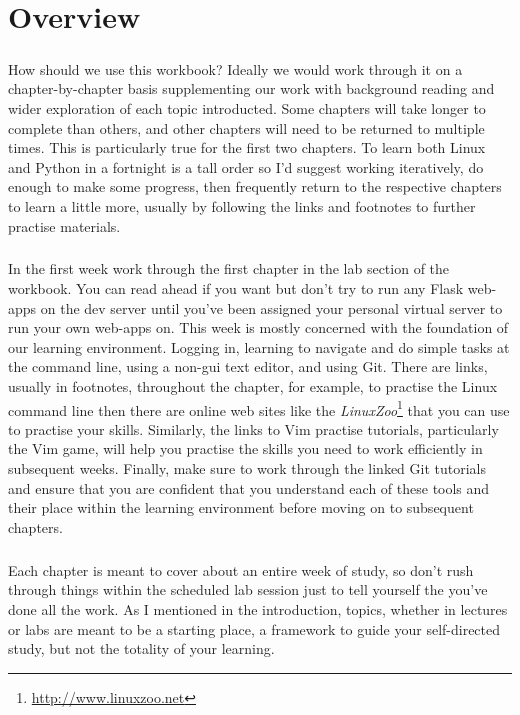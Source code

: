 \documentclass[12pt, a4paper, oneside]{book}
\begin{document}
\chapter{Overview}
\label{overview}
\paragraph{} How should we use this workbook? Ideally we would work through it on a chapter-by-chapter basis supplementing our work with background reading and wider exploration of each topic introducted. Some chapters will take longer to complete than others, and other chapters will need to be returned to multiple times. This is particularly true for the first two chapters. To learn both Linux and Python in a fortnight is a tall order so I'd suggest working iteratively, do enough to make some progress, then frequently return to the respective chapters to learn a little more, usually by following the links and footnotes to further practise materials.

\paragraph{} In the first week work through the first chapter in the lab section of the workbook. You can read ahead if you want but don't try to run any Flask web-apps on the dev server until you've been assigned your personal virtual server to run your own web-apps on. This week is mostly concerned with the foundation of our learning environment. Logging in, learning to navigate and do simple tasks at the command line, using a non-gui text editor, and using Git. There are links, usually in footnotes, throughout the chapter, for example, to practise the Linux command line then there are online web sites like the \emph{LinuxZoo}\footnote{\url{http://www.linuxzoo.net}} that you can use to practise your skills. Similarly, the links to Vim practise tutorials, particularly the Vim game, will help you practise the skills you need to work efficiently in subsequent weeks. Finally, make sure to work through the linked Git tutorials and ensure that you are confident that you understand each of these tools and their place within the learning environment before moving on to subsequent chapters. 

\paragraph{} Each chapter is meant to cover about an entire week of study, so don't rush through things within the scheduled lab session just to tell yourself the you've done all the work. As I mentioned in the introduction, topics, whether in lectures or labs are meant to be a starting place, a framework to guide your self-directed study, but not the totality of your learning. 
\end{document}
